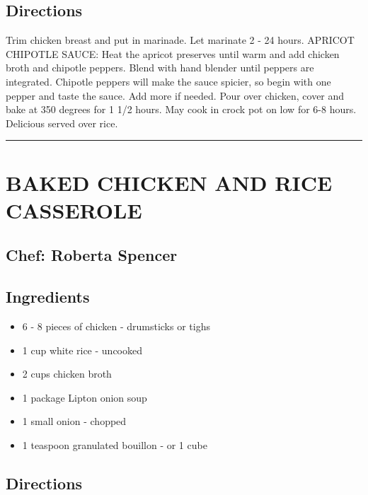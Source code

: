 \documentclass[
]{book}
\providecommand{\tightlist}{%
  \setlength{\itemsep}{0pt}\setlength{\parskip}{0pt}}
\begin{document}
\hypertarget{directions-40}{%
\subsection*{Directions}\label{directions-40}}


Trim chicken breast and put in marinade. Let marinate 2 - 24 hours.
APRICOT CHIPOTLE SAUCE: Heat the apricot preserves until warm and
add chicken broth and chipotle peppers. Blend with hand blender until peppers
are integrated. Chipotle peppers will make the sauce spicier, so
begin with one pepper and taste the sauce. Add more if needed.
Pour over chicken, cover and bake at 350 degrees for 1 1/2 hours.
May cook in crock pot on low for 6-8 hours. Delicious served over rice.

\begin{center}\rule{0.5\linewidth}{0.5pt}\end{center}

\hypertarget{baked-chicken-and-rice-casserole}{%
\section*{BAKED CHICKEN AND RICE CASSEROLE}\label{baked-chicken-and-rice-casserole}}


\hypertarget{chef-roberta-spencer-14}{%
\subsection*{Chef: Roberta Spencer}\label{chef-roberta-spencer-14}}


\hypertarget{ingredients-41}{%
\subsection*{Ingredients}\label{ingredients-41}}


\begin{itemize}
\tightlist
\item
  6 - 8 pieces of chicken - drumsticks or tighs
\item
  1 cup white rice - uncooked
\item
  2 cups chicken broth
\item
  1 package Lipton onion soup
\item
  1 small onion - chopped
\item
  1 teaspoon granulated bouillon - or 1 cube
\end{itemize}

\hypertarget{directions-41}{%
\subsection*{Directions}\label{directions-41}}
\end{document}
